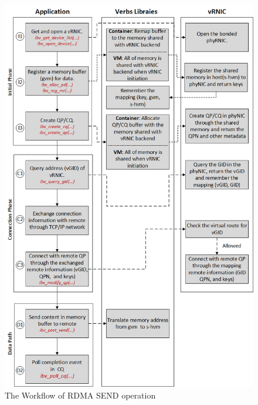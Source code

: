 \begin{figure}[!ht]
	\centering
	\includegraphics[width=1\linewidth]{images/RDMA-path.png}
	\caption{The Workflow of RDMA SEND operation}
	\label{fig:route-config}
\end{figure}




